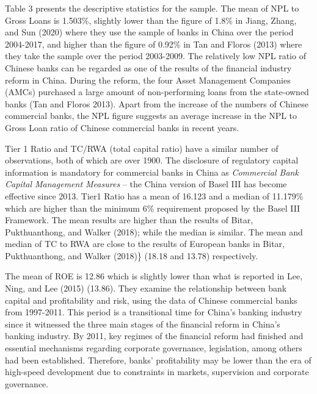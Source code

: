 \documentclass{article}
\begin{document}
Table 3 presents the descriptive statistics for the sample. The mean of
NPL to Gross Loans is 1.503\%, slightly lower than the figure of 1.8\%
in Jiang, Zhang, and Sun (2020) where they use the sample of banks in
China over the period 2004-2017, and higher than the figure of 0.92\% in
Tan and Floros (2013) where they take the sample over the period
2003-2009. The relatively low NPL ratio of Chinese banks can be regarded
as one of the results of the financial industry reform in China. During
the reform, the four Asset Management Companies (AMCs) purchased a large
amount of non-performing loans from the state-owned banks (Tan and
Floros 2013). Apart from the increase of the numbers of Chinese
commercial banks, the NPL figure suggests an average increase in the NPL
to Gross Loan ratio of Chinese commercial banks in recent years.

Tier 1 Ratio and TC/RWA (total capital ratio) have a similar number of
observations, both of which are over 1900. The disclosure of regulatory
capital information is mandatory for commercial banks in China as
\emph{Commercial Bank Capital Management Measures} -- the China version
of Basel III has become effective since 2013. Tier1 Ratio has a mean of
16.123 and a median of 11.179\% which are higher than the minimum 6\%
requirement proposed by the Basel III Framework. The mean results are
higher than the results of Bitar, Pukthuanthong, and Walker (2018);
while the median is similar. The mean and median of TC to RWA are close
to the results of European banks in Bitar, Pukthuanthong, and Walker
(2018)\} (18.18 and 13.78) respectively.

The mean of ROE is 12.86 which is slightly lower than what is reported
in Lee, Ning, and Lee (2015) (13.86). They examine the relationship
between bank capital and profitability and risk, using the data of
Chinese commercial banks from 1997-2011. This period is a transitional
time for China's banking industry since it witnessed the three main
stages of the financial reform in China's banking industry. By 2011, key
regimes of the financial reform had finished and essential mechanisms
regarding corporate governance, legislation, among others had been
established. Therefore, banks' profitability may be lower than the era
of high-speed development due to constraints in markets, supervision and
corporate governance.
\end{document}
